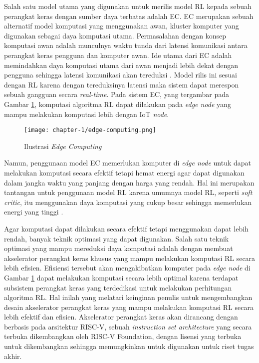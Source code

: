Salah satu model utama yang digunakan untuk merilis model RL kepada sebuah perangkat keras dengan sumber daya terbatas adalah \ac{EC}. \ac{EC} merupakan sebuah alternatif model komputasi yang menggunakan awan, kluster komputer yang digunakan sebagai daya komputasi utama. Permasalahan dengan konsep komputasi awan adalah munculnya waktu tunda dari latensi komunikasi antara perangkat keras pengguna dan komputer awan. Ide utama dari \ac{EC} adalah memindahkan daya komputasi utama dari awan menjadi lebih dekat dengan pengguna sehingga latensi komunikasi akan tereduksi \parencite{edgecomputing}. Model rilis ini sesuai dengan RL karena dengan tereduksinya latensi maka sistem dapat merespon sebuah gangguan secara \textit{real-time}. Pada sistem \ac{EC}, yang tergambar pada Gambar \ref{fig:edge-computing}, komputasi algoritma RL dapat dilakukan pada \textit{edge node} yang mampu melakukan komputasi lebih dengan \ac{IoT} \textit{node}.

\begin{figure}[h]
	\centering
	\texttt{[image: chapter-1/edge-computing.png]}
	\caption{Ilustrasi \textit{Edge Computing}}
	\label{fig:edge-computing}
\end{figure}

Namun, penggunaan model \ac{EC} memerlukan komputer di \textit{edge node} untuk dapat melakukan komputasi secara efektif tetapi hemat energi agar dapat digunakan dalam jangka waktu yang panjang dengan harga yang rendah. Hal ini merupakan tantangan untuk penggunaan model \ac{RL} karena umumnya model \ac{RL}, seperti \textit{soft critic}, itu menggunakan daya komputasi yang cukup besar sehingga memerlukan energi yang tinggi \parencite{wang2022efficient}.

Agar komputasi dapat dilakukan secara efektif tetapi menggunakan dapat lebih rendah, banyak teknik optimasi yang dapat digunakan. Salah satu teknik optimasi yang mampu mereduksi daya komputasi adalah dengan membuat akselerator perangkat keras khusus yang mampu melakukan komputasi RL secara lebih efisien. Efisiensi tersebut akan mengakibatkan komputer pada \textit{edge node} di Gambar \ref{fig:edge-computing} dapat melakukan komputasi secara lebih optimal karena terdapat subsistem perangkat keras yang terdedikasi untuk melakukan perhitungan algoritma RL. Hal inilah yang melatari keinginan penulis untuk mengembangkan desain akselerator perangkat keras yang mampu melakukan komputasi RL secara lebih efektif dan efisien. Akselerator perangkat keras akan dirancang dengan berbasis pada arsitektur RISC-V, sebuah \textit{instruction set architecture} yang secara terbuka dikembangkan oleh RISC-V Foundation, dengan lisensi yang terbuka untuk dikembangkan sehingga memungkinkan untuk digunakan untuk riset tugas akhir.
